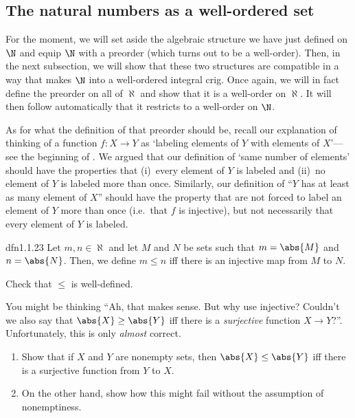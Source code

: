 \subsection{The natural numbers as a well-ordered set}

For the moment, we will set aside the algebraic structure we have just defined on $\N$ and equip $\N$ with a preorder (which turns out to be a well-order).  Then, in the next subsection, we will show that these two structures are compatible in a way that makes $\N$ into a well-ordered integral crig.  Once again, we will in fact define the preorder on all of $\aleph$ and show that it is a well-order on $\aleph$.  It will then follow automatically that it restricts to a well-order on $\N$.

As for what the definition of that preorder should be, recall our explanation of thinking of a function $f\colon X\rightarrow Y$ as `labeling elements of $Y$ with elements of $X$'---see the beginning of .  We argued that our definition of `same number of elements' should have the properties that (i)~every element of $Y$ is labeled and (ii)~no element of $Y$ is labeled more than once.  Similarly, our definition of ``$Y$ has at least as many element of $X$'' should have the property that are not forced to label an element of $Y$ more than once (i.e.~that $f$ is injective), but not necessarily that every element of $Y$ is labeled.
\begin{dfn}{}{dfn1.1.23}
Let $m,n\in \aleph$ and let $M$ and $N$ be sets such that $m=\abs{M}$ and $n=\abs{N}$.  Then, we define $m\leq n$ iff there is an injective map from $M$ to $N$.
\begin{exr}[breakable=false]{}{}
Check that $\leq$ is well-defined.
\end{exr}
\end{dfn}
You might be thinking ``Ah, that makes sense.  But why use injective?  Couldn't we also say that $\abs{X}\geq \abs{Y}$ iff there is a \emph{surjective} function $X\rightarrow Y$?''.  Unfortunately, this is only \emph{almost} correct.
\begin{exr}{}{}
\begin{enumerate}
\item Show that if $X$ and $Y$ are nonempty sets, then $\abs{X}\leq \abs{Y}$ iff there is a surjective function from $Y$ to $X$.
\item On the other hand, show how this might fail without the assumption of nonemptiness.
\end{enumerate}
\end{exr}
